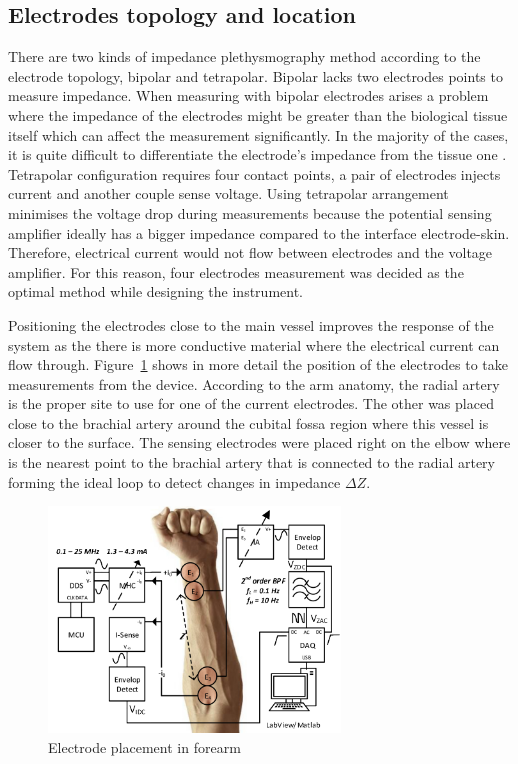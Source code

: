 \subsection{Electrodes topology and location}
There are two kinds of impedance plethysmography method according to the electrode topology, bipolar and tetrapolar. Bipolar lacks two electrodes points to measure impedance. When measuring with bipolar electrodes arises a problem where the impedance of the electrodes might be greater than the biological tissue itself which can affect the measurement significantly. In the majority of the cases, it is quite difficult to differentiate the electrode's impedance from the tissue one \cite{brown2000bipolar}. Tetrapolar configuration requires four contact points, a pair of electrodes injects current and another couple sense voltage. Using tetrapolar arrangement minimises the voltage drop during measurements because the potential sensing amplifier ideally has a bigger impedance compared to the interface electrode-skin. Therefore, electrical current would not flow between electrodes and the voltage amplifier. For this reason, four electrodes measurement was decided as the optimal method while designing the instrument. 

Positioning the electrodes close to the main vessel improves the response of the system as the there is more conductive material where the electrical current can flow through. Figure~\ref{fig:electrode} shows in more detail the position of the electrodes to take measurements from the device. According to the arm anatomy, the radial artery is the proper site to use for one of the current electrodes. The other was placed close to the brachial artery around the cubital fossa region where this vessel is closer to the surface. The sensing electrodes were placed right on the elbow where is the nearest point to the brachial artery that is connected to the radial artery forming the ideal loop to detect changes in impedance $\Delta Z$.  

\begin{figure}[!htpb]
	\centering
	\includegraphics[width=7.75cm,keepaspectratio]{figure1}	
    \caption{Electrode placement in forearm}
    \label{fig:electrode}
\end{figure}


